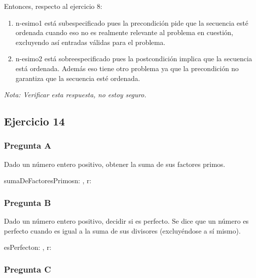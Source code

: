 Entonces, respecto al ejercicio 8:

\begin{enumerate}[1)]
    \item n-esimo1 está subespecificado pues la precondición pide que la secuencia esté ordenada cuando eso no es realmente relevante al problema en cuestión, excluyendo así entradas válidas para el problema.
    \item n-esimo2 está sobreespecificado pues la postcondición implica que la secuencia está ordenada. Además eso tiene otro problema ya que la precondición no garantiza que la secuencia esté ordenada.
\end{enumerate}

{\em Nota: Verificar esta respuesta, no estoy seguro.}

\subsection{Ejercicio 14}

\subsubsection{Pregunta A}

Dado un número entero positivo, obtener la suma de sus factores primos.


\begin{proc}{sumaDeFactoresPrimos}{\In n: \ent, \Out r: \ent}{}
\end{proc}

\subsubsection{Pregunta B}

Dado un número entero positivo, decidir si es perfecto. Se dice que un número es perfecto cuando es igual a la suma de sus divisores (excluyéndose a sí mismo).

\begin{proc}{esPerfecto}{\In n: \ent, \Out r: \bool}{}
\end{proc}

\subsubsection{Pregunta C}

